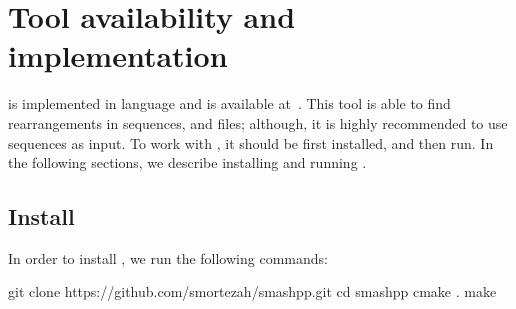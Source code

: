 \clearpage
\section{Tool availability and implementation} \label{sTool}
\smashpp is implemented in \cpp language and is available at~\cite{web-smashpp}. This tool is able to find rearrangements in sequences, \fasta and \fastq files; although, it is highly recommended to use sequences as input. To work with \smashpp, it should be first installed, and then run. 
In the following sections, we describe installing and running \smashpp.


\subsection{Install}
In order to install \smashpp, we run the following commands:
\begin{code}[style=bash]
git clone https://github.com/smortezah/smashpp.git
cd smashpp
cmake .
make
\end{code}


